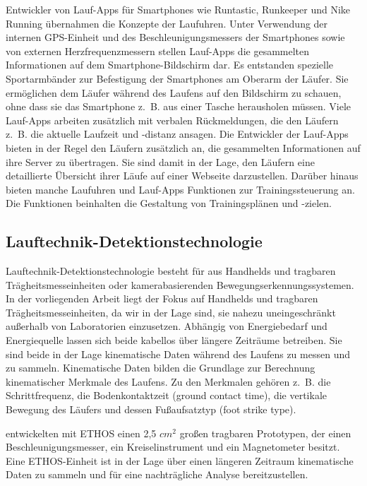 Entwickler von Lauf-Apps für Smartphones wie Runtastic, Runkeeper und Nike Running übernahmen die Konzepte der Laufuhren. Unter Verwendung der internen \acs{GPS}-Einheit und des Beschleunigungsmessers der Smartphones sowie von externen Herzfrequenzmessern stellen Lauf-Apps die gesammelten Informationen auf dem Smartphone-Bildschirm dar. Es entstanden spezielle Sportarmbänder zur Befestigung der Smartphones am Oberarm der Läufer. Sie ermöglichen dem Läufer während des Laufens auf den Bildschirm zu schauen, ohne dass sie das Smartphone z.~B. aus einer Tasche herausholen müssen. Viele Lauf-Apps arbeiten zusätzlich mit verbalen Rückmeldungen, die den Läufern z.~B. die aktuelle Laufzeit und -distanz ansagen. Die Entwickler der Lauf-Apps bieten in der Regel den Läufern zusätzlich an, die gesammelten Informationen auf ihre Server zu übertragen. Sie sind damit in der Lage, den Läufern eine detaillierte Übersicht ihrer Läufe auf einer Webseite darzustellen. Darüber hinaus bieten manche Laufuhren und Lauf-Apps Funktionen zur Trainingssteuerung an. Die Funktionen beinhalten die Gestaltung von Trainingsplänen und -zielen.

\subsection{Lauftechnik-Detektionstechnologie} 

\label{sub:lauftechnik_detektionstechnologie}

Lauftechnik-Detektionstechnologie besteht für \citet{Jensen2014} aus Handhelds und tragbaren Trägheitsmesseinheiten oder kamerabasierenden Bewegungserkennungssystemen. In der vorliegenden Arbeit liegt der Fokus auf Handhelds und tragbaren Trägheitsmesseinheiten, da wir in der Lage sind, sie nahezu uneingeschränkt außerhalb von Laboratorien einzusetzen. Abhängig von Energiebedarf und Energiequelle lassen sich beide kabellos über längere Zeiträume betreiben. Sie sind beide in der Lage kinematische Daten während des Laufens zu messen und zu sammeln. Kinematische Daten bilden die Grundlage zur Berechnung kinematischer Merkmale des Laufens. Zu den Merkmalen gehören z.~B. die Schrittfrequenz, die Bodenkontaktzeit (ground contact time), die vertikale Bewegung des Läufers und dessen Fußaufsatztyp (foot strike type).

\citet{Harms2010} entwickelten mit ETHOS einen 2,5 $cm^{2}$ großen tragbaren Prototypen, der einen Beschleunigungsmesser, ein Kreiselinstrument und ein Magnetometer besitzt. Eine ETHOS-Einheit ist in der Lage über einen längeren Zeitraum kinematische Daten zu sammeln und für eine nachträgliche Analyse bereitzustellen.

